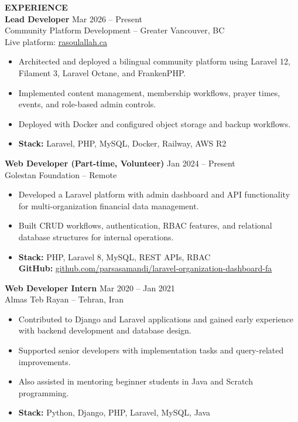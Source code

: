 \documentclass[10pt,letterpaper]{article}
\begin{document}
\vspace{6pt}

\textbf{EXPERIENCE}\\[4pt]

\textbf{Lead Developer} \hfill Mar 2026 -- Present\\
Community Platform Development -- Greater Vancouver, BC\\
Live platform: \href{https://www.rasoulallah.ca/}{rasoulallah.ca}
\begin{itemize}
    \item Architected and deployed a bilingual community platform using Laravel 12, Filament 3, Laravel Octane, and FrankenPHP.
    \item Implemented content management, membership workflows, prayer times, events, and role-based admin controls.
    \item Deployed with Docker and configured object storage and backup workflows.
    \item \textbf{Stack:} Laravel, PHP, MySQL, Docker, Railway, AWS R2
\end{itemize}

\vspace{3pt}

\textbf{Web Developer (Part-time, Volunteer)} \hfill Jan 2024 -- Present\\
Golestan Foundation -- Remote
\begin{itemize}
    \item Developed a Laravel platform with admin dashboard and API functionality for multi-organization financial data management.
    \item Built CRUD workflows, authentication, RBAC features, and relational database structures for internal operations.
    \item \textbf{Stack:} PHP, Laravel 8, MySQL, REST APIs, RBAC\\
    \textbf{GitHub:} \href{https://github.com/parsasamandi/laravel-organization-dashboard-fa}{github.com/parsasamandi/laravel-organization-dashboard-fa}
\end{itemize}

\vspace{3pt}

\textbf{Web Developer Intern} \hfill Mar 2020 -- Jan 2021\\
Almas Teb Rayan -- Tehran, Iran
\begin{itemize}
    \item Contributed to Django and Laravel applications and gained early experience with backend development and database design.
    \item Supported senior developers with implementation tasks and query-related improvements.
    \item Also assisted in mentoring beginner students in Java and Scratch programming.
    \item \textbf{Stack:} Python, Django, PHP, Laravel, MySQL, Java
\end{itemize}
\end{document}

